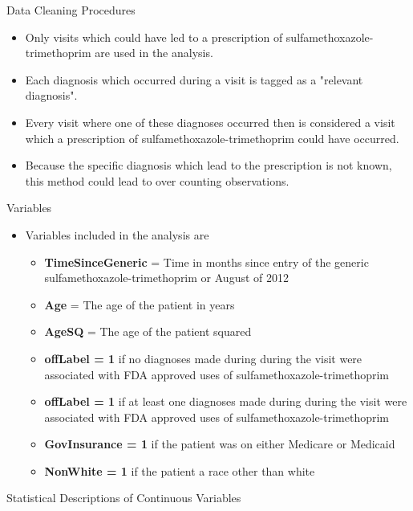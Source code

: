 \documentclass{beamer}
\begin{document}
\begin{frame}{Data Cleaning Procedures}
\begin{itemize}
\item Only visits which could have led to a prescription of sulfamethoxazole-trimethoprim are used in the analysis.
\item Each diagnosis which occurred during a visit is tagged as a "relevant diagnosis".
\item Every visit where one of these diagnoses occurred then is considered a visit which a prescription of sulfamethoxazole-trimethoprim could have occurred.
\item Because the specific diagnosis which lead to the prescription is not known, this method could lead to over counting observations.
\end{itemize}
\end{frame}

\begin{frame}{Variables}
\begin{itemize}
\item Variables included in the analysis are
\begin{itemize}
  \item \textbf{TimeSinceGeneric} = Time in months since entry of the generic sulfamethoxazole-trimethoprim or August of 2012
  \item \textbf{Age} = The age of the patient in years
  \item \textbf{AgeSQ} = The age of the patient squared
  \item \textbf{offLabel = 1} if no diagnoses made during during the visit were associated with FDA approved uses of sulfamethoxazole-trimethoprim
  \item \textbf{offLabel = 1} if at least one diagnoses made during during the visit were associated with FDA approved uses of sulfamethoxazole-trimethoprim  
  \item \textbf{GovInsurance = 1} if the patient was on either Medicare or Medicaid
  \item \textbf{NonWhite = 1} if the patient a race other than white
\end{itemize}
\end{itemize}
\end{frame}

\begin{frame}{Statistical Descriptions of Continuous Variables}
\scalebox{.475}{}
\end{frame}
\end{document}
